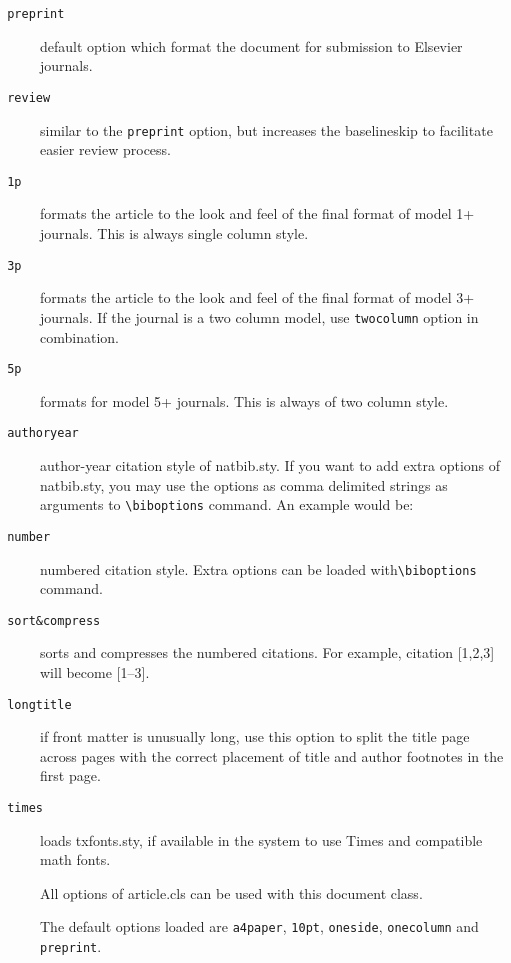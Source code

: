 \documentclass[a4paper,12pt]{article}
\def\file#1{\textsf{#1}\xspace}
\begin{document}
	\begin{description}
	
	\item [{\tt\color{verbcolor} preprint}]  default option which format the
	  document for submission to Elsevier journals.
	
	\item [{\tt\color{verbcolor} review}]  similar to the \verb+preprint+ option, but
	  increases the baselineskip to facilitate easier review process.
	
	\item [{\tt\color{verbcolor} 1p}]  formats the article to the look and feel of the final
	  format of model 1+ journals. This is always single column style.
	
	\item [{\tt\color{verbcolor} 3p}] formats the article to the look and feel of the final
	  format of model 3+ journals. If the journal is a two column
	model, use \verb+twocolumn+ option in combination.
	
	\item [{\tt\color{verbcolor} 5p}] formats for model 5+ journals. This is always
	  of two column style.
	
	\item [{\tt\color{verbcolor} authoryear}] author-year citation style of
	  \file{natbib.sty}. If you want to add extra options of
	\file{natbib.sty}, you may use the options as comma delimited
	strings as arguments to \verb+\biboptions+ command. An example
	would be:
	\end{description}
	\begin{vquote}
	\end{vquote}
	
	\begin{description}
	\item [{\tt\color{verbcolor} number}] numbered citation style. Extra options
	  can be loaded with\linebreak \verb+\biboptions+ command.
	
	\item [{\tt\color{verbcolor} sort\&compress}] sorts and compresses the
	numbered citations. For example, citation [1,2,3] will become [1--3].
	
	\item [{\tt\color{verbcolor} longtitle}] if front matter is unusually long, use
	  this option to split the title page across pages with the correct
	placement of title and author footnotes in the first page.
	
	\item [{\tt\color{verbcolor} times}] loads \file{txfonts.sty}, if available in
	  the system to use Times and compatible math fonts.
	
	\item[] All options of \file{article.cls} can be used with this
	  document class.
	
	\item[] The default options loaded are \verb+a4paper+, \verb+10pt+,
	  \verb+oneside+, \verb+onecolumn+ and \verb+preprint+.
	
	\end{description}
	
\end{document}
